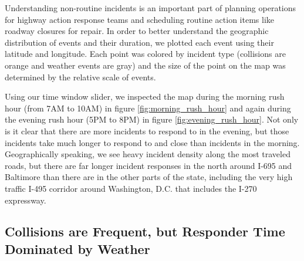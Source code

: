 \documentclass[11pt,letterpaper]{article}
\begin{document}
Understanding non-routine incidents is an important part of planning operations for highway action response teams and scheduling routine action items like roadway closures for repair. In order to better understand the geographic distribution of events and their duration, we plotted each event using their latitude and longitude. Each point was colored by incident type (collisions are orange and weather events are gray) and the size of the point on the map was determined by the relative scale of events. 

Using our time window slider, we inspected the map during the morning rush hour (from 7AM to 10AM) in figure \ref{fig:morning_rush_hour} and again during the evening rush hour (5PM to 8PM) in figure \ref{fig:evening_rush_hour}. Not only is it clear that there are more incidents to respond to in the evening, but those incidents take much longer to respond to and close than incidents in the morning. Geographically speaking, we see heavy incident density along the most traveled roads, but there are far longer incident responses in the north around I-695 and Baltimore than there are in the other parts of the state, including the very high traffic I-495 corridor around Washington, D.C. that includes the I-270 expressway.  

\subsection*{Collisions are Frequent, but Responder Time Dominated by Weather}
\end{document}
